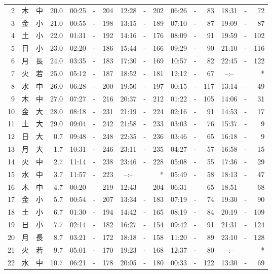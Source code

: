 \documentclass[12pt.a4j]{jsarticle}
\begin{document}
\begin{center}
\begin{table}[ht]
\begin{tabular}{|rc|cr|ccrccr|ccrccr|}
 2 & 木 & 中 & 20.0 & 00:25 &-& 204 & 12:28 &-& 202 & 06:26 &-&  83 & 18:31 &-&  72 \\
 3 & 金 & 小 & 21.0 & 00:55 &-& 198 & 13:15 &-& 189 & 07:10 &-&  87 & 19:09 &-&  87 \\
 4 & 土 & 小 & 22.0 & 01:31 &-& 192 & 14:16 &-& 176 & 08:09 &-&  91 & 19:59 &-& 102 \\
 5 & 日 & 小 & 23.0 & 02:20 &-& 186 & 15:44 &-& 166 & 09:29 &-&  90 & 21:10 &-& 116 \\
 6 & 月 & 長 & 24.0 & 03:35 &-& 183 & 17:30 &-& 169 & 10:57 &-&  82 & 22:45 &-& 122 \\
 7 & 火 & 若 & 25.0 & 05:12 &-& 187 & 18:52 &-& 181 & 12:12 &-&  67 & --:-- & &  *  \\
 8 & 水 & 中 & 26.0 & 06:28 &-& 200 & 19:50 &-& 197 & 00:15 &-& 117 & 13:14 &-&  49 \\
 9 & 木 & 中 & 27.0 & 07:27 &-& 216 & 20:37 &-& 212 & 01:22 &-& 105 & 14:06 &-&  31 \\
10 & 金 & 大 & 28.0 & 08:18 &-& 231 & 21:19 &-& 224 & 02:16 &-&  91 & 14:53 &-&  17 \\
11 & 土 & 大 & 29.0 & 09:04 &-& 242 & 21:58 &-& 233 & 03:03 &-&  76 & 15:37 &-&   9 \\
12 & 日 & 大 &  0.7 & 09:48 &-& 248 & 22:35 &-& 236 & 03:46 &-&  65 & 16:18 &-&   9 \\
13 & 月 & 大 &  1.7 & 10:31 &-& 246 & 23:11 &-& 235 & 04:27 &-&  57 & 16:58 &-&  15 \\
14 & 火 & 中 &  2.7 & 11:14 &-& 238 & 23:46 &-& 228 & 05:08 &-&  55 & 17:36 &-&  29 \\
15 & 水 & 中 &  3.7 & 11:57 &-& 223 & --:-- & &  *  & 05:49 &-&  58 & 18:13 &-&  47 \\
16 & 木 & 中 &  4.7 & 00:20 &-& 219 & 12:43 &-& 204 & 06:31 &-&  65 & 18:51 &-&  68 \\
17 & 金 & 小 &  5.7 & 00:54 &-& 207 & 13:34 &-& 183 & 07:19 &-&  74 & 19:30 &-&  90 \\
18 & 土 & 小 &  6.7 & 01:30 &-& 194 & 14:42 &-& 165 & 08:19 &-&  84 & 20:19 &-& 109 \\
19 & 日 & 小 &  7.7 & 02:14 &-& 182 & 16:27 &-& 154 & 09:42 &-&  91 & 21:31 &-& 124 \\
20 & 月 & 長 &  8.7 & 03:21 &-& 172 & 18:18 &-& 158 & 11:20 &-&  89 & 23:10 &-& 128 \\
21 & 火 & 若 &  9.7 & 05:01 &-& 170 & 19:23 &-& 168 & 12:37 &-&  80 & --:-- & &  *  \\
22 & 水 & 中 & 10.7 & 06:21 &-& 178 & 20:05 &-& 180 & 00:33 &-& 122 & 13:30 &-&  69 \\

\end{tabular}
\end{table}
\end{center}
\end{document}
